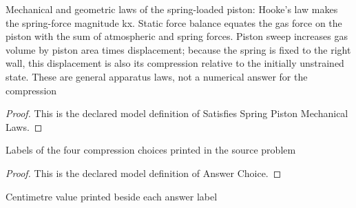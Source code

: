 \begin{definition}
  \label{def:physics:phyx-mini-0375:phyxminiproblems-problemphyxmini0375-satisfiesspringpistonmechanicallaws}
  Mechanical and geometric laws of the spring-loaded piston: Hooke's law makes the spring-force magnitude kx. Static force balance equates the gas force on the piston with the sum of atmospheric and spring forces. Piston sweep increases gas volume by piston area times displacement; because the spring is fixed to the right wall, this displacement is also its compression relative to the initially unstrained state. These are general apparatus laws, not a numerical answer for the compression
\end{definition}
\begin{proof}
  This is the declared model definition of Satisfies Spring Piston Mechanical Laws.
\end{proof}
\begin{definition}
  \label{def:physics:phyx-mini-0375:phyxminiproblems-problemphyxmini0375-answerchoice}
  Labels of the four compression choices printed in the source problem
\end{definition}
\begin{proof}
  This is the declared model definition of Answer Choice.
\end{proof}
\begin{definition}
  \label{def:physics:phyx-mini-0375:phyxminiproblems-problemphyxmini0375-displayedcompressionincentimeters}
  Centimetre value printed beside each answer label
\end{definition}
